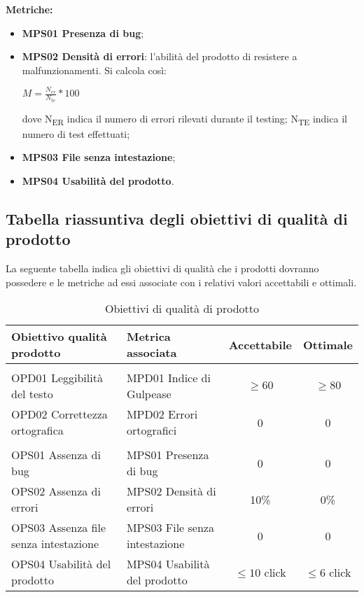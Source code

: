 \documentclass[../piano_di_qualifica.tex]{subfiles}
\begin{document}
\textbf{Metriche:}
\smallbreak
\begin{itemize}
	\item \textbf{MPS01 Presenza di bug};
	\item \textbf{MPS02 Densità di errori}: l'abilità del prodotto di resistere a malfunzionamenti. Si calcola così: 
	\begin{center} $M = \frac{N_{er}}{N_{te}} * 100$ \end{center}
	dove
	\subitem N\textsubscript{ER} indica il numero di errori rilevati durante il testing;
	\subitem N\textsubscript{TE} indica il numero di test effettuati;
	\item \textbf{MPS03 File senza intestazione};
	\item \textbf{MPS04 Usabilità del prodotto}.
\end{itemize}

\subsection{Tabella riassuntiva degli obiettivi di qualità di prodotto}
La seguente tabella indica gli obiettivi di qualità che i prodotti dovranno possedere e le metriche ad essi associate con i relativi valori accettabili e ottimali. \\

\begin{table}[!ht]
	\centering
	\begin{tabular}{|l|l|c|c|}
		\hline
		\rowcolor{lightgray}
		\textbf{Obiettivo qualità prodotto}                    	& \textbf{Metrica associata}             & \textbf{Accettabile} & \textbf{Ottimale} \\	
		\hline \rowcolor{lightgray} \multicolumn{4}{|c|}{Documenti} \\
		\hline 
		OPD01 Leggibilità del testo           	& MPD01 Indice di Gulpease      & \(\ge 60\)           & \(\ge 80\)           \\
		OPD02 Correttezza ortografica         	& MPD02 Errori ortografici      & 0                    & 0                    \\
		\hline \rowcolor{lightgray} \multicolumn{4}{|c|}{Software} \\
		\hline
		OPS01 Assenza di bug                  	& MPS01 Presenza di bug         & 0                    & 0                    \\
		OPS02 Assenza di errori              	& MPS02 Densità di errori       & 10\%                 & 0\%                  \\
		OPS03 Assenza file senza intestazione 	& MPS03 File senza intestazione & 0                    & 0                    \\
		OPS04 Usabilità del prodotto          	& MPS04 Usabilità del prodotto  & \(\leq10\) click     & \(\leq6\) click      \\
		\hline
	\end{tabular}
	\caption{Obiettivi di qualità di prodotto}
\end{table}
\end{document}

